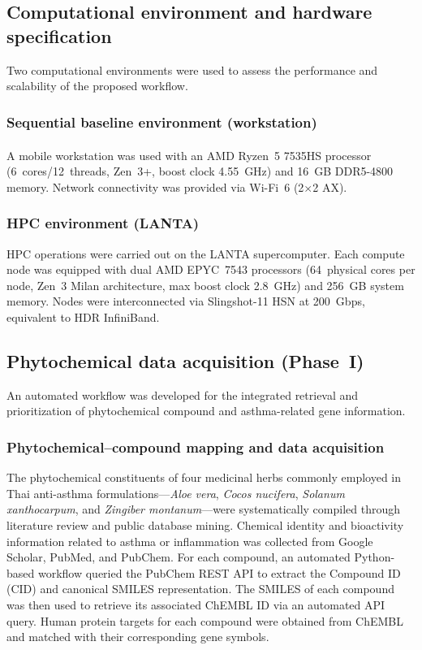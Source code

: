 \documentclass[11pt,a4paper]{article}
\begin{document}
\subsection{Computational environment and hardware specification}

Two computational environments were used to assess the performance and scalability of the proposed workflow.

\subsubsection{Sequential baseline environment (workstation)}

A mobile workstation was used with an AMD Ryzen\textsuperscript{\texttrademark}~5 7535HS processor (6~cores/12~threads, Zen~3+, boost clock \SI{4.55}{GHz}) and \SI{16}{GB} DDR5-4800 memory. Network connectivity was provided via Wi-Fi~6 (2$\times$2 AX).

\subsubsection{HPC environment (LANTA)}

HPC operations were carried out on the LANTA supercomputer. Each compute node was equipped with dual AMD EPYC~7543 processors (64~physical cores per node, Zen~3 Milan architecture, max boost clock \SI{2.8}{GHz}) and \SI{256}{GB} system memory. Nodes were interconnected via Slingshot-11 HSN at \SI{200}{Gbps}, equivalent to HDR InfiniBand.


\subsection{Phytochemical data acquisition (Phase~I)}

An automated workflow was developed for the integrated retrieval and prioritization of phytochemical compound and asthma-related gene information.

\subsubsection{Phytochemical--compound mapping and data acquisition}

The phytochemical constituents of four medicinal herbs commonly employed in Thai anti-asthma formulations---\textit{Aloe vera}, \textit{Cocos nucifera}, \textit{Solanum xanthocarpum}, and \textit{Zingiber montanum}---were systematically compiled through literature review and public database mining. Chemical identity and bioactivity information related to asthma or inflammation was collected from Google Scholar, PubMed, and PubChem. For each compound, an automated Python-based workflow queried the PubChem REST API to extract the Compound ID (CID) and canonical SMILES representation. The SMILES of each compound was then used to retrieve its associated ChEMBL ID via an automated API query. Human protein targets for each compound were obtained from ChEMBL and matched with their corresponding gene symbols.
\end{document}
